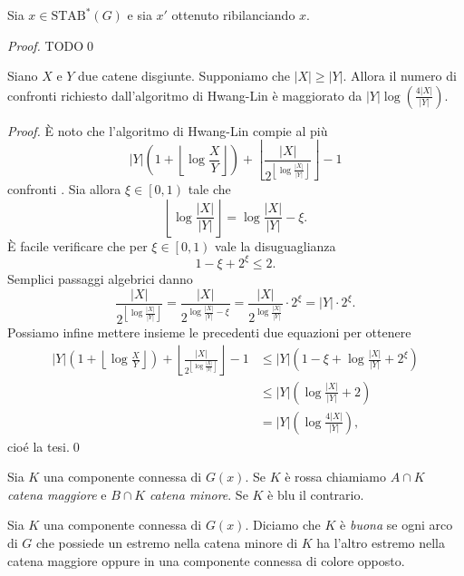 \begin{lemma}
	\label{consistentlemma} Sia \(x\in\text{STAB}^{*}(G)\) e sia \(x'\) ottenuto ribilanciando \(x\). 
\end{lemma}
\begin{proof}
	TODO\qed 
\end{proof}
\begin{lemma}
	\label{hwanglinlemma} Siano \(X\) e \(Y\) due catene disgiunte. Supponiamo che \(|X|\ge|Y|\). Allora il numero di confronti richiesto dall'algoritmo di Hwang-Lin è maggiorato da \(|Y|\log(\frac{4|X|}{|Y|})\). 
\end{lemma}
\begin{proof}
	È noto che l'algoritmo di Hwang-Lin compie al più
	\[|Y|\left(1+\left\lfloor{\log{\frac{X}{Y}}}\right\rfloor\right)+\left\lfloor\frac{|X|}{2^{\left\lfloor\log{\frac{|X|}{|Y|}}\right\rfloor}}\right\rfloor-1\]
	confronti \cite{Hwang1972}. Sia allora \(\xi\in\left[0,1\right)\) tale che
	\[\left\lfloor\log{\frac{|X|}{|Y|}}\right\rfloor=\log{\frac{|X|}{|Y|}}-\xi.\]
	È facile verificare che per \(\xi\in\left[0,1\right)\) vale la disuguaglianza
	\[1-\xi+2^{\xi}\le 2.\]
	Semplici passaggi algebrici danno
	\[\frac{|X|}{2^{\left\lfloor\log{\frac{|X|}{|Y|}}\right\rfloor}}=\frac{|X|}{2^{\log{\frac{|X|}{|Y|}}-\xi}}=\frac{|X|}{2^{\log{\frac{|X|}{|Y|}}}}\cdot 2^{\xi}=|Y|\cdot 2^{\xi}.\]
	Possiamo infine mettere insieme le precedenti due equazioni per ottenere 
	\begin{align}
		|Y|\left(1+\left\lfloor{\log{\frac{X}{Y}}}\right\rfloor\right)+\left\lfloor\frac{|X|}{2^{\left\lfloor\log{\frac{|X|}{|Y|}}\right\rfloor}}\right\rfloor-1&\le|Y|\left(1-\xi+\log{\frac{|X|}{|Y|}}+2^{\xi}\right) \nonumber \\
		&\le |Y|\left(\log{\frac{|X|}{|Y|}}+2\right) \nonumber \\
		&= |Y|\left(\log{\frac{4|X|}{|Y|}}\right), \nonumber 
	\end{align}
	cioé la tesi.\qed 
\end{proof}
\begin{definition}
	Sia \(K\) una componente connessa di \(G(x)\). Se \(K\) è rossa chiamiamo \(A\cap K\) \emph{catena maggiore} e \(B\cap K\) \emph{catena minore}. Se \(K\) è blu il contrario. 
\end{definition}
\begin{definition}
	Sia \(K\) una componente connessa di \(G(x)\). Diciamo che \(K\) è \emph{buona} se ogni arco di \(G\) che possiede un estremo nella catena minore di \(K\) ha l'altro estremo nella catena maggiore oppure in una componente connessa di colore opposto. 
\end{definition}
